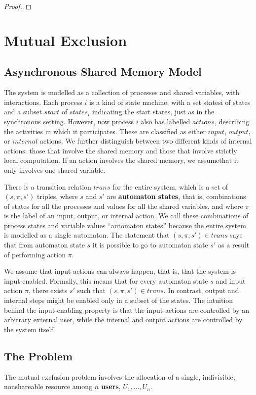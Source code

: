 \documentclass[11pt]{article}
\begin{document}
\begin{proof}
        
\end{proof}
\section{Mutual Exclusion}
\label{sec:org737011f}
\subsection{Asynchronous Shared Memory Model}
\label{sec:org04f8130}
The system is modelled as a collection of processes and shared variables,
with interactions. Each process \(i\) is a kind of state machine, with a set statesi of states and a subset \(start\) of \(states_i\) indicating the
start states, just as in the synchronous setting. However, now process \(i\) also has labelled
\(actions\), describing the activities in which it participates. These are classified as either
\(input\), \(output\), or \(internal\) actions. We further distinguish between two different kinds of
internal actions: those that involve the shared memory and those that involve strictly local
computation. If an action involves the shared memory, we assumethat it only involves one shared
variable.

There is a transition relation \(trans\) for the entire system, which is a set of \((s,\pi,s')\)
triples, where \(s\) and \(s'\) are \textbf{automaton states}, that is, combinations of states for all the
processes and values for all the shared variables, and where \(\pi\)  is the label of an input,
output, or internal action. We call these combinations of process states and variable values
``automaton states'' because  the entire system is modelled as a single automaton. The statement that
\((s,\pi,s')\in trans\) says that from automaton state \(s\) it is possible to go to automaton state
\(s'\) as a result of performing action \(\pi\).

We assume that input actions can always happen, that is, that the system is input-enabled. Formally,
this means that for every automaton state \(s\) and input action \(\pi\), there exists \(s'\) such
that \((s,\pi,s')\in trans\). In contrast, output and internal steps might be enabled only in a subset
of the states. The intuition behind the input-enabling property is that the input actions are
controlled by an arbitrary external user, while the internal and output actions are controlled by the
system itself.
\subsection{The Problem}
\label{sec:org7f8cc7c}
The mutual exclusion problem involves the allocation of a single, indivisible, nonshareable resource
among \(n\) \textbf{users}, \(U_1,\dots,U_n\).
\end{document}
